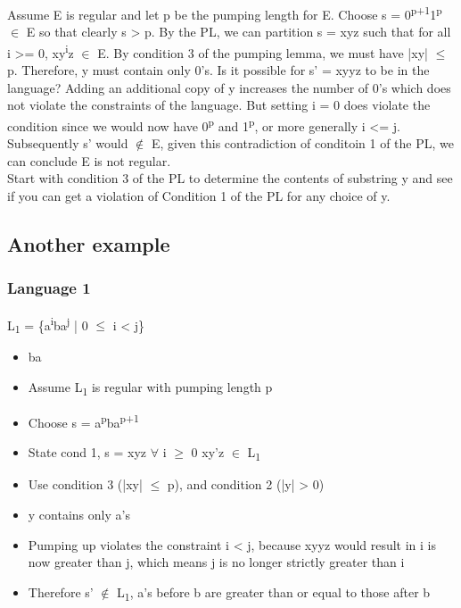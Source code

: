 \documentclass[11pt]{article}
\begin{document}
Assume E is regular and let p be the pumping length for E. Choose s = 0\textsuperscript{p+1}1\textsuperscript{p} \(\in\) E so that clearly s > p. By the PL, we can partition s = xyz such that for all i >= 0, xy\textsuperscript{i}z \(\in\) E. By condition 3 of the pumping lemma, we must have |xy| \(\le\) p. Therefore, y must contain only 0's. Is it possible for s' = xyyz to be in the language? Adding an additional copy of y increases the number of 0's which does not violate the constraints of the language. But setting i = 0 does violate the condition since we would now have 0\textsuperscript{p} and 1\textsuperscript{p}, or more generally i <= j. Subsequently s' would \(\notin\) E, given this contradiction of conditoin 1 of the PL, we can conclude E is not regular.\\

Start with condition 3 of the PL to determine the contents of substring y and see if you can get a violation of Condition 1 of the PL for any choice of y.\\
\subsection{Another example}
\label{sec:orgdef5c47}
\subsubsection{Language 1}
\label{sec:org5a7d5c4}
L\textsubscript{1} = \{a\textsuperscript{i}ba\textsuperscript{j} | 0 \(\le\) i < j\}\\
\begin{itemize}
\item ba\\
\item Assume L\textsubscript{1} is regular with pumping length p\\
\item Choose s = a\textsuperscript{p}ba\textsuperscript{p+1}\\
\item State cond 1, s = xyz \(\forall\) i \(\ge\) 0 xy'z \(\in\) L\textsubscript{1}\\
\item Use condition 3 (|xy| \(\le\) p), and condition 2 (|y| > 0)\\
\item y contains only a's\\
\item Pumping up violates the constraint i < j, because xyyz would result in i is now greater than j, which means j is no longer strictly greater than i\\
\item Therefore s' \(\notin\) L\textsubscript{1}, a's before b are greater than or equal to those after b\\
\end{itemize}
\end{document}
